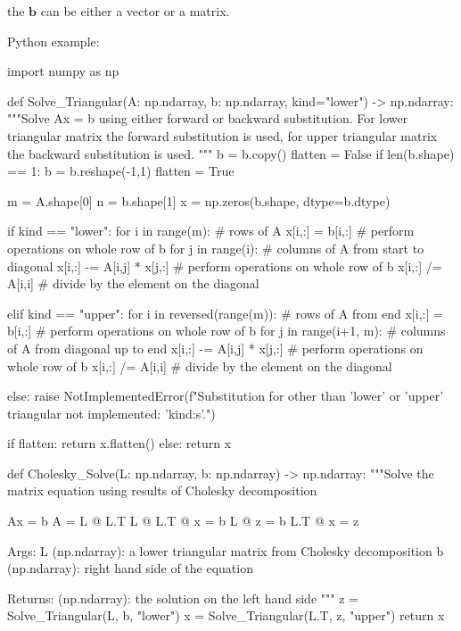 the $ \mathbf{b} $ can be either a vector or a matrix.

Python example:

\begin{python}
import numpy as np

def Solve_Triangular(A: np.ndarray, b: np.ndarray, kind="lower") -> np.ndarray:
    """Solve Ax = b using either forward or backward substitution. For lower
    triangular matrix the forward substitution is used, for upper triangular
    matrix the backward substitution is used.
    """
    b = b.copy()
    flatten = False
    if len(b.shape) == 1:
        b = b.reshape(-1,1)
        flatten = True

    m = A.shape[0]
    n = b.shape[1]
    x = np.zeros(b.shape, dtype=b.dtype)

    if kind == "lower":
        for i in range(m):                # rows of A
            x[i,:] = b[i,:]               # perform operations on whole row of b
            for j in range(i):            # columns of A from start to diagonal
                x[i,:] -= A[i,j] * x[j,:] # perform operations on whole row of b
            x[i,:] /= A[i,i]              # divide by the element on the diagonal

    elif kind == "upper":
        for i in reversed(range(m)):      # rows of A from end
            x[i,:] = b[i,:]               # perform operations on whole row of b
            for j in range(i+1, m):       # columns of A from diagonal up to end
                x[i,:] -= A[i,j] * x[j,:] # perform operations on whole row of b
            x[i,:] /= A[i,i]              # divide by the element on the diagonal

    else:
        raise NotImplementedError(f"Substitution for other than 'lower' or 'upper' triangular not implemented: '{kind:s}'.")

    if flatten:
        return x.flatten()
    else:
        return x


def Cholesky_Solve(L: np.ndarray, b: np.ndarray) -> np.ndarray:
    """Solve the matrix equation using results of Cholesky decomposition

        Ax = b
        A = L @ L.T
        L @ L.T @ x = b
        L @ z = b
        L.T @ x = z

    Args:
        L (np.ndarray): a lower triangular matrix from Cholesky decomposition
        b (np.ndarray): right hand side of the equation

    Returns:
        (np.ndarray): the solution on the left hand side
    """
    z = Solve_Triangular(L,   b, "lower")
    x = Solve_Triangular(L.T, z, "upper")
    return x

\end{python}



